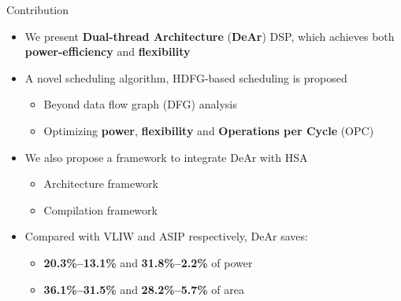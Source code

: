 \documentclass{beamer}
\begin{document}
\begin{CJK}{UTF8}{bkai}
    \begin{frame}{Contribution}
        \begin{itemize}
            \item <2->{
                    We present \textbf{Dual-thread Architecture} (\textbf{DeAr}) DSP, which achieves both \textbf{power-efficiency} and \textbf{flexibility}
                }
            \item <3->{
                    A novel scheduling algorithm, HDFG-based scheduling is proposed
                    \begin{itemize}
                        \item Beyond data flow graph (DFG) analysis
                        \item Optimizing \textbf{power}, \textbf{flexibility} and \textbf{Operations per Cycle} (OPC)
                    \end{itemize}
                }
            \item <4->{
                    We also propose a framework to integrate DeAr with HSA
                    \begin{itemize}
                        \item {
                                Architecture framework
                            }
                        \item {
                                Compilation framework
                            }
                    \end{itemize}
                }
            \item <5->{
                    Compared with VLIW and ASIP respectively, DeAr saves: 
                    \begin{itemize}
                        \item {
                                \textbf{20.3\%--13.1\%} and \textbf{31.8\%--2.2\%} of power
                                }
                            \item {
                                    \textbf{36.1\%--31.5\%} and \textbf{28.2\%--5.7\%} of area
                                    }
                            \end{itemize}
                        }
                \end{itemize}
            \end{frame}


\end{CJK}
\end{document}
